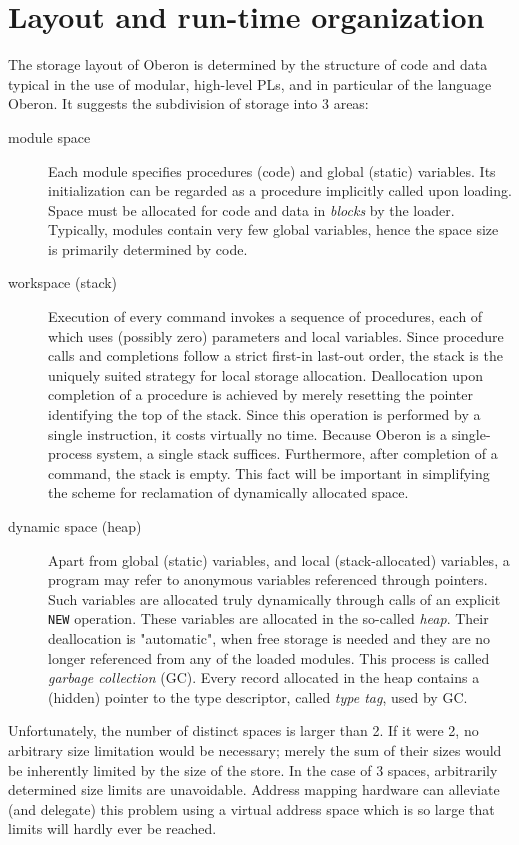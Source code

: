 \section{Layout and run-time organization}
The storage layout of Oberon is determined by the structure of code and data typical in the
use of modular, high-level PLs, and in particular of the language Oberon.
It suggests the subdivision of storage into 3 areas:
\begin{description}
  \item[module space] Each module specifies procedures (code) and global (static) variables.
    Its initialization can be regarded as a procedure implicitly called upon loading. Space
    must be allocated for code and data in \emph{blocks} by the loader. Typically, modules
    contain very few global variables, hence the space size is primarily determined by code.
  \item[workspace (stack)] Execution of every command invokes a sequence of procedures, each
    of which uses (possibly zero) parameters and local variables. Since procedure calls and
    completions follow a strict first-in last-out order, the stack is the uniquely suited
    strategy for local storage allocation. Deallocation upon completion of a procedure is
    achieved by merely resetting the pointer identifying the top of the stack. Since this
    operation is performed by a single instruction, it costs virtually no time. Because
    Oberon is a single-process system, a single stack suffices. Furthermore, after completion
    of a command, the stack is empty. This fact will be important in simplifying the scheme
    for reclamation of dynamically allocated space.
  \item[dynamic space (heap)] Apart from global (static) variables, and local (stack-allocated)
    variables, a program may refer to anonymous variables referenced through pointers. Such
    variables are allocated truly dynamically through calls of an explicit \verb|NEW| operation.
    These variables are allocated in the so-called \emph{heap}. Their deallocation is "automatic",
    when free storage is needed and they are no longer referenced from any of the loaded modules.
    This process is called \emph{garbage collection} (GC). Every record allocated in the heap
    contains a (hidden) pointer to the type descriptor, called \emph{type tag}, used by GC.
\end{description}
Unfortunately, the number of distinct spaces is larger than 2. If it were 2, no arbitrary
size limitation would be necessary; merely the sum of their sizes would be inherently limited
by the size of the store. In the case of 3 spaces, arbitrarily determined size limits are
unavoidable. Address mapping hardware can alleviate (and delegate) this problem using a
virtual address space which is so large that limits will hardly ever be reached.

